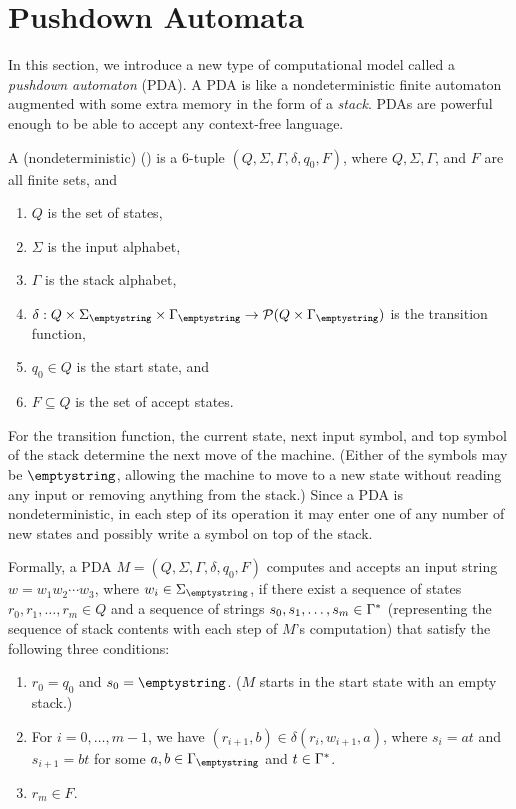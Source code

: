 \documentclass[twoside,letterpaper,openany]{book}
\begin{document}
\clearpage

\section{Pushdown Automata}

\begin{discussion}
In this section, we introduce a new type of computational model called a \emph{pushdown automaton} (PDA). A PDA is like a nondeterministic finite automaton augmented with some extra memory in the form of a \emph{stack}. PDAs are powerful enough to be able to accept any context-free language.
\end{discussion}


\begin{defn}
A (nondeterministic)  () is a 6-tuple $(Q, \Sigma, \Gamma, \delta, q_0, F)$, where $Q, \Sigma, \Gamma$, and $F$ are all finite sets, and
\begin{enumerate}
\item $Q$ is the set of states,
\item $\Sigma$ is the input alphabet,
\item $\Gamma$ is the stack alphabet,
\item $\delta: Q \times \Sigma_\emptystring \times \Gamma_\emptystring \rightarrow \powerset{Q \times \Gamma_\emptystring}$ is the transition function,
\item $q_0 \in Q$ is the start state, and
\item $F \subseteq Q$ is the set of accept states.
\end{enumerate}

For the transition function, the current state, next input symbol, and top symbol of the stack determine the next move of the machine. (Either of the symbols may be $\emptystring$, allowing the machine to move to a new state without reading any input or removing anything from the stack.) Since a PDA is nondeterministic, in each step of its operation it may enter one of any number of new states and possibly write a symbol on top of the stack.

Formally, a PDA $M = (Q, \Sigma, \Gamma, \delta, q_0, F)$ computes and accepts an input string $w = w_1w_2\cdots w_3$, where $w_i \in \Sigma_\emptystring$, if there exist a sequence of states $r_0, r_1, \ldots, r_m \in Q$ and a sequence of strings $s_0, s_1, \ldots, s_m \in \Gamma^{*}$ (representing the sequence of stack contents with each step of $M$'s computation) that satisfy the following three conditions:
\begin{enumerate}
\item $r_0 = q_0$ and $s_0 = \emptystring$. ($M$ starts in the start state with an empty stack.)
\item For $i = 0, \ldots, m-1$, we have $(r_{i+1}, b) \in \delta(r_i, w_{i+1}, a)$, where $s_i = at$ and $s_{i+1} = bt$ for some $a, b \in \Gamma_\emptystring$ and $t \in \Gamma^{*}$. 
\item $r_m \in F$.
\end{enumerate}


\end{defn}
\end{document}
